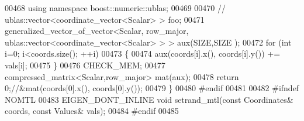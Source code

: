 \begin{DoxyCode}
00468   \textcolor{keyword}{using namespace }boost::numeric::ublas;
00469 
00470 \textcolor{comment}{//   ublas::vector<coordinate\_vector<Scalar> > foo;}
00471   generalized\_vector\_of\_vector<Scalar, row\_major, ublas::vector<coordinate\_vector<Scalar> > > aux(SIZE,SIZE
      );
00472   \textcolor{keywordflow}{for} (\textcolor{keywordtype}{int} i=0; i<coords.size(); ++i)
00473   \{
00474     aux(coords[i].x(), coords[i].y()) += vals[i];
00475   \}
00476   CHECK\_MEM;
00477   compressed\_matrix<Scalar,row\_major> mat(aux);
00478   \textcolor{keywordflow}{return} 0;\textcolor{comment}{//&mat(coords[0].x(), coords[0].y());}
00479 \}
00480 \textcolor{preprocessor}{#endif}
00481 
00482 \textcolor{preprocessor}{#ifndef NOMTL}
00483 EIGEN\_DONT\_INLINE \textcolor{keywordtype}{void} setrand\_mtl(\textcolor{keyword}{const} Coordinates& coords, \textcolor{keyword}{const} Values& vals);
00484 \textcolor{preprocessor}{#endif}
00485 
\end{DoxyCode}
